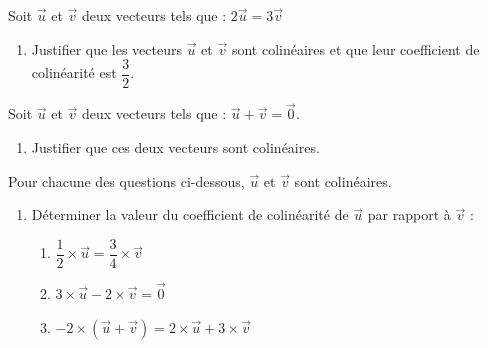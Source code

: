 \begin{exo}{}
	Soit $\vec{u}$ et $\vec{v}$ deux vecteurs tels que : $2\vec{u} = 3\vec{v}$
	\begin{enumerate}
		\item Justifier que les vecteurs $\vec{u}$ et $\vec{v}$ sont colinéaires et que leur coefficient de colinéarité est $\dfrac{3}{2}$.
	\end{enumerate}
	\vspace*{2mm}
	Soit $\vec{u}$ et $\vec{v}$ deux vecteurs tels que : $\vec{u} + \vec{v} = \vec{0}$.
	\begin{enumerate}[resume]
		\item Justifier que ces deux vecteurs sont colinéaires.
	\end{enumerate}
	\vspace*{2mm}
	Pour chacune des questions ci-dessous, $\vec{u}$ et $\vec{v}$ sont colinéaires.
	\begin{enumerate}[resume]
		\item Déterminer la valeur du coefficient de colinéarité de $\vec{u}$ par rapport à $\vec{v}$ :
		      \begin{enumerate}[itemsep=2mm]
			      \item $\dfrac{1}{2} \times \vec{u} = \dfrac{3}{4} \times \vec{v}$
			      \item $3 \times \vec{u} - 2 \times \vec{v} = \vec{0}$
			      \item $-2 \times (\vec{u} + \vec{v}) = 2 \times \vec{u} + 3 \times \vec{v}$
		      \end{enumerate}
	\end{enumerate}
\end{exo}
